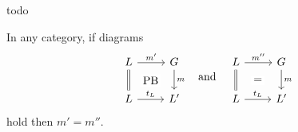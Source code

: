 \documentclass{book}
\begin{document}
\begin{example}
  todo
\end{example}

    \begin{proposition}
      In any category, if diagrams
    \[
    \begin{tikzcd}
    L \arrow[r, "m'"] \arrow[d, equals] & G \arrow[d, "m"] \\
    L \arrow[r, "t_L"] & L'
    \arrow[phantom, from=1-1, to=2-2, "\mathrm{PB}" description]
    \end{tikzcd}
    \quad \text{and} \quad
    \begin{tikzcd}
    L \arrow[r, "m''"] \arrow[d, equals] & G \arrow[d, "m"] \\
    L \arrow[r, "t_L"] & L'
    \arrow[phantom, from=1-1, to=2-2, "\mathrm{=}" description]
    \end{tikzcd}
    \]
    hold then $m' \mathop{=} m''$.
    \end{proposition}
    
\end{document}
